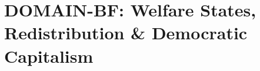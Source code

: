 \section{DOMAIN-BF: Welfare States, Redistribution \& Democratic Capitalism}
\label{app:domain-socialdemocracy}

%
%
%
%
%

